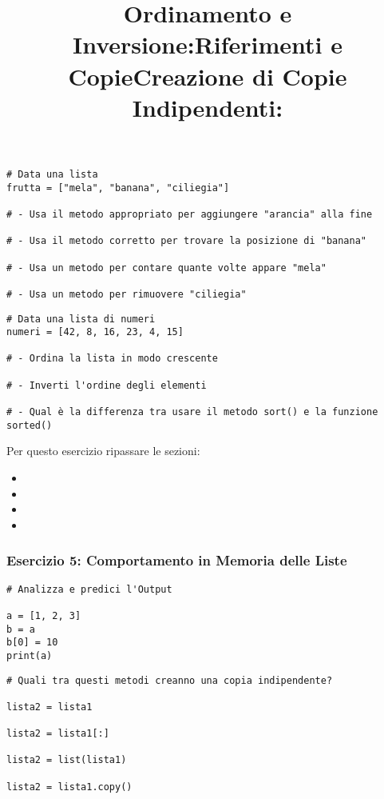 \begin{lstlisting}
# Data una lista
frutta = ["mela", "banana", "ciliegia"]

# - Usa il metodo appropriato per aggiungere "arancia" alla fine
    
# - Usa il metodo corretto per trovare la posizione di "banana"

# - Usa un metodo per contare quante volte appare "mela"

# - Usa un metodo per rimuovere "ciliegia"

\end{lstlisting}


\title{\textbf{Ordinamento e Inversione:}}


\begin{lstlisting}
# Data una lista di numeri
numeri = [42, 8, 16, 23, 4, 15]

# - Ordina la lista in modo crescente

# - Inverti l'ordine degli elementi

# - Qual è la differenza tra usare il metodo sort() e la funzione sorted()
\end{lstlisting}






Per questo esercizio ripassare le sezioni:
\begin{itemize}
    \item {}
    \item {}
    \item  {}
    \item  {}
\end{itemize}


\subsubsection{Esercizio 5: Comportamento in Memoria delle Liste}\label{Esercizio5Liste}
\title{\textbf{Riferimenti e Copie}}


\begin{lstlisting}
# Analizza e predici l'Output

a = [1, 2, 3]
b = a
b[0] = 10
print(a)

\end{lstlisting}


\title{\textbf{Creazione di Copie Indipendenti:}}
\begin{lstlisting}
# Quali tra questi metodi creanno una copia indipendente?

lista2 = lista1

lista2 = lista1[:]

lista2 = list(lista1)

lista2 = lista1.copy()

\end{lstlisting}



